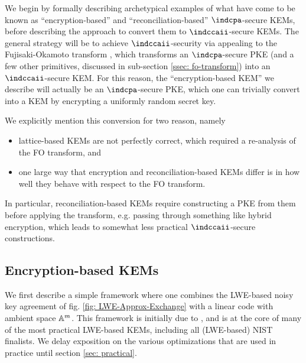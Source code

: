 \label{sec: paradigms}
We begin by formally describing archetypical examples of what have come to be known as ``encryption-based'' and ``reconciliation-based'' $\indcpa$-secure KEMs, before describing the approach to convert them to $\indccaii$-secure KEMs.
The general strategy will be to achieve $\indccaii$-security via appealing to the Fujisaki-Okamoto transform \cite{JC:FujOka13}, which transforms an $\indcpa$-secure PKE (and a few other primitives, discussed in sub-section \ref{ssec: fo-transform}) into an $\indccaii$-secure KEM.
For this reason, the ``encryption-based KEM'' we describe will actually be an $\indcpa$-secure PKE, which one can trivially convert into a KEM by encrypting a uniformly random secret key.

We explicitly mention this conversion for two reason, namely
\begin{itemize}
	\item lattice-based KEMs are not perfectly correct, which required a re-analysis of the FO transform, and
	\item one large way that encryption and reconciliation-based KEMs differ is in how well they behave with respect to the FO transform.
\end{itemize}
In particular, reconciliation-based KEMs require constructing a PKE from them before applying the transform, e.g. passing through something like hybrid encryption, which leads to somewhat less practical $\indccaii$-secure constructions.

\subsection{Encryption-based KEMs}
We first describe a simple framework where one combines the LWE-based noisy key agreement of fig. \ref{fig: LWE-Approx-Exchange} with a linear code with ambient space $\mathbb{A}^m$.
This framework is initially due to \cite{EC:LyuPeiReg13}, and is at the core of many of the most practical LWE-based KEMs, including all (LWE-based) NIST finalists.
We delay exposition on the various optimizations that are used in practice until section \ref{sec: practical}.

